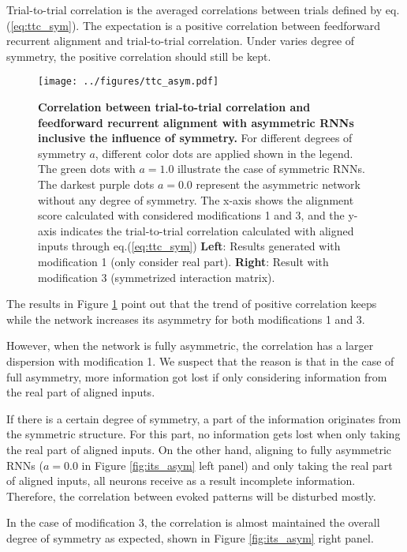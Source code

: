 \documentclass[11pt]{article}
\begin{document}
	Trial-to-trial correlation is the averaged correlations between trials defined by eq.(\ref{eq:ttc_sym}). The expectation is a positive correlation between feedforward recurrent alignment and trial-to-trial correlation. Under varies degree of symmetry, the positive correlation should still be kept.
		\begin{figure}[H]
			\centering
			\texttt{[image: ../figures/ttc\_asym.pdf]}
			\caption[Correlation between trial-to-trial correlation and feedforward recurrent alignment with asymmetric RNNs inclusive the influence of symmetry]{\textbf{Correlation between trial-to-trial correlation and feedforward recurrent alignment with asymmetric RNNs inclusive the influence of symmetry.} For different degrees of symmetry $a$, different color dots are applied shown in the legend. The green dots with $a=1.0$ illustrate the case of symmetric RNNs. The darkest purple dots $a=0.0$ represent the asymmetric network without any degree of symmetry. The x-axis shows the alignment score calculated with considered modifications 1 and 3, and the y-axis indicates the trial-to-trial correlation calculated with aligned inputs through eq.(\ref{eq:ttc_sym}) \textbf{Left}: Results generated with modification 1 (only consider real part). \textbf{Right}: Result with modification 3 (symmetrized interaction matrix).}
			\label{fig:ttc_asym}
		\end{figure}
	The results in Figure \ref{fig:ttc_asym} point out that the trend of positive correlation keeps while the network increases its asymmetry for both modifications 1 and 3. 
	
	However, when the network is fully asymmetric, the correlation has a larger dispersion with modification 1. We suspect that the reason is that in the case of full asymmetry, more information got lost if only considering information from the real part of aligned inputs. 
	
	If there is a certain degree of symmetry, a part of the information originates from the symmetric structure. For this part, no information gets lost when only taking the real part of aligned inputs. On the other hand, aligning to fully asymmetric RNNs ($a = 0.0$ in Figure \ref{fig:its_asym} left panel) and only taking the real part of aligned inputs, all neurons receive as a result incomplete information. Therefore, the correlation between evoked patterns will be disturbed mostly. 
	
	In the case of modification 3, the correlation is almost maintained the overall degree of symmetry as expected, shown in Figure \ref{fig:its_asym} right panel. 
	
\end{document}
